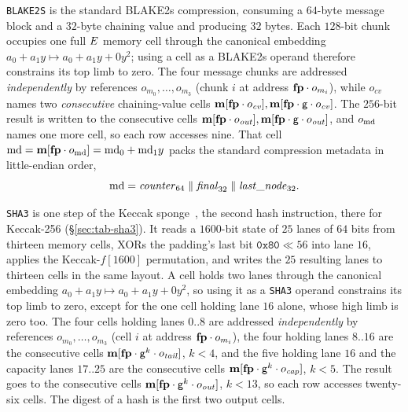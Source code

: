 \vspace{5mm}

\texttt{BLAKE2S} is the standard BLAKE2s compression, consuming a $64$-byte message block and a $32$-byte chaining value and producing $32$ bytes. Each $128$-bit chunk occupies one full $E$ memory cell through the canonical embedding $a_0+a_1y\mapsto a_0+a_1y+0y^2$; using a cell as a BLAKE2s operand therefore constrains its top limb to zero. The four message chunks are addressed \emph{independently} by references $o_{m_0},\dots,o_{m_3}$ (chunk $i$ at address $\mathbf{fp}\cdot o_{m_i}$), while $o_{\mathit{cv}}$ names two \emph{consecutive} chaining-value cells $\mathbf{m}[\mathbf{fp}\cdot o_{\mathit{cv}}],\mathbf{m}[\mathbf{fp}\cdot \mathsf{g}\cdot o_{\mathit{cv}}]$. The $256$-bit result is written to the consecutive cells $\mathbf{m}[\mathbf{fp}\cdot o_{\mathit{out}}],\mathbf{m}[\mathbf{fp}\cdot \mathsf{g}\cdot o_{\mathit{out}}]$, and $o_{\mathrm{md}}$ names one more cell, so each row accesses nine. That cell $\mathrm{md}=\mathbf{m}[\mathbf{fp}\cdot o_{\mathrm{md}}]=\mathrm{md}_0+\mathrm{md}_1y$ packs the standard compression metadata in little-endian order,
\[
  \mathrm{md}=\mathit{counter}_{64}\;\Vert\;\mathit{final}_{32}\;\Vert\;\mathit{last\_node}_{32}.
\]

\texttt{SHA3} is one step of the Keccak sponge~\cite{fips202}, the second hash instruction, there for Keccak-256 (\S\ref{sec:tab-sha3}). It reads a $1600$-bit state of $25$ lanes of $64$ bits from thirteen memory cells, XORs the padding's last bit $\mathtt{0x80}\ll 56$ into lane $16$, applies the Keccak-$f[1600]$ permutation, and writes the $25$ resulting lanes to thirteen cells in the same layout. A cell holds two lanes through the canonical embedding $a_0+a_1y\mapsto a_0+a_1y+0y^2$, so using it as a \texttt{SHA3} operand constrains its top limb to zero, except for the one cell holding lane $16$ alone, whose high limb is zero too. The four cells holding lanes $0..8$ are addressed \emph{independently} by references $o_{m_0},\dots,o_{m_3}$ (cell $i$ at address $\mathbf{fp}\cdot o_{m_i}$), the four holding lanes $8..16$ are the consecutive cells $\mathbf{m}[\mathbf{fp}\cdot \mathsf{g}^k\cdot o_{\mathit{tail}}]$, $k<4$, and the five holding lane $16$ and the capacity lanes $17..25$ are the consecutive cells $\mathbf{m}[\mathbf{fp}\cdot \mathsf{g}^k\cdot o_{\mathit{cap}}]$, $k<5$. The result goes to the consecutive cells $\mathbf{m}[\mathbf{fp}\cdot \mathsf{g}^k\cdot o_{\mathit{out}}]$, $k<13$, so each row accesses twenty-six cells. The digest of a hash is the first two output cells.


